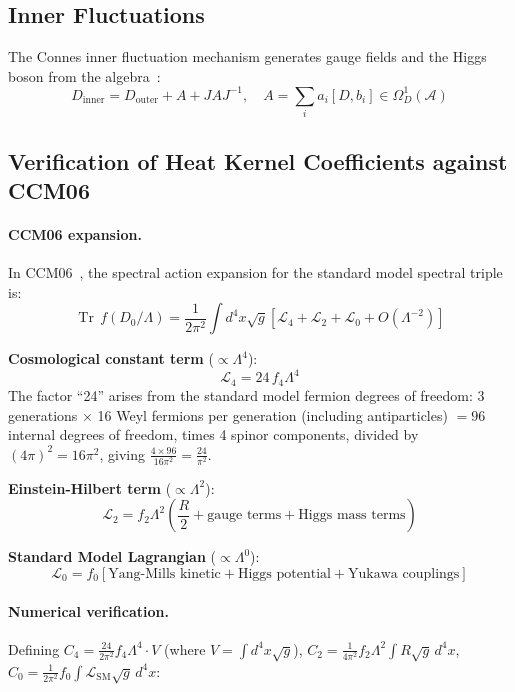 \documentclass[11pt,a4paper]{article}
\theoremstyle{remark}
\providecommand{\Tr}{\operatorname{Tr}}
\begin{document}
\subsection{Inner Fluctuations}

The Connes inner fluctuation mechanism generates gauge fields and the Higgs boson from the algebra~\cite{Con94, CCM06}:
\[
  D_{\mathrm{inner}} = D_{\mathrm{outer}} + A + JAJ^{-1}, \quad A = \sum_i a_i [D, b_i] \in \Omega^1_D(\mathcal{A})
\]

\subsection{Verification of Heat Kernel Coefficients against CCM06}
\label{sec:heatkernel}

\paragraph{CCM06 expansion.}
In CCM06~\cite{CCM06}, the spectral action expansion for the standard model spectral triple is:
\[
  \Tr\, f(D_0/\Lambda) = \frac{1}{2\pi^2} \int d^4x\sqrt{g}\left[\mathcal{L}_4 + \mathcal{L}_2 + \mathcal{L}_0 + O(\Lambda^{-2})\right]
\]

\textbf{Cosmological constant term} ($\propto \Lambda^4$):
\[
  \mathcal{L}_4 = 24\, f_4 \Lambda^4
\]
The factor ``24'' arises from the standard model fermion degrees of freedom: 3 generations $\times$ 16 Weyl fermions per generation (including antiparticles) $= 96$ internal degrees of freedom, times 4 spinor components, divided by $(4\pi)^2 = 16\pi^2$, giving $\frac{4 \times 96}{16\pi^2} = \frac{24}{\pi^2}$.

\textbf{Einstein-Hilbert term} ($\propto \Lambda^2$):
\[
  \mathcal{L}_2 = f_2 \Lambda^2 \left(\frac{R}{2} + \text{gauge terms} + \text{Higgs mass terms}\right)
\]

\textbf{Standard Model Lagrangian} ($\propto \Lambda^0$):
\[
  \mathcal{L}_0 = f_0 \left[\text{Yang-Mills kinetic} + \text{Higgs potential} + \text{Yukawa couplings}\right]
\]

\paragraph{Numerical verification.}
Defining $C_4 = \frac{24}{2\pi^2} f_4 \Lambda^4 \cdot V$ (where $V = \int d^4x\sqrt{g}$), $C_2 = \frac{1}{4\pi^2} f_2 \Lambda^2 \int R\sqrt{g}\,d^4x$, $C_0 = \frac{1}{2\pi^2} f_0 \int \mathcal{L}_{\mathrm{SM}}\sqrt{g}\,d^4x$:
\end{document}
